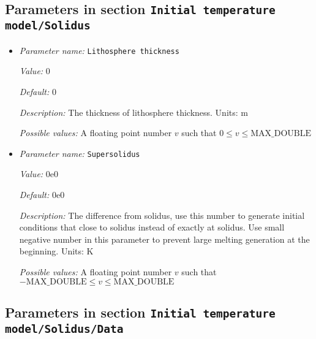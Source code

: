 \subsection{Parameters in section \tt Initial temperature model/Solidus}
\label{parameters:Initial_20temperature_20model/Solidus}

\begin{itemize}
\item {\it Parameter name:} {\tt Lithosphere thickness}
\label{parameters:Initial temperature model/Solidus/Lithosphere thickness}


{\it Value:} 0


{\it Default:} 0


{\it Description:} The thickness of lithosphere thickness. Units: m


{\it Possible values:} A floating point number $v$ such that $0 \leq v \leq \text{MAX\_DOUBLE}$
\item {\it Parameter name:} {\tt Supersolidus}
\label{parameters:Initial temperature model/Solidus/Supersolidus}


{\it Value:} 0e0


{\it Default:} 0e0


{\it Description:} The difference from solidus, use this number to generate initial conditions that close to solidus instead of exactly at solidus. Use small negative number in this parameter to prevent large melting generation at the beginning.   Units: K 


{\it Possible values:} A floating point number $v$ such that $-\text{MAX\_DOUBLE} \leq v \leq \text{MAX\_DOUBLE}$
\end{itemize}



\subsection{Parameters in section \tt Initial temperature model/Solidus/Data}
\label{parameters:Initial_20temperature_20model/Solidus/Data}

